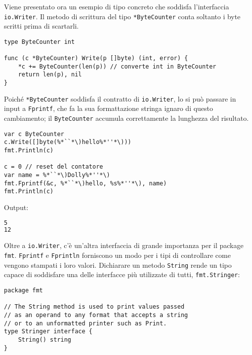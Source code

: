 Viene presentato ora un esempio di tipo concreto che soddisfa l'interfaccia \verb|io.Writer|.
Il metodo di scrittura del tipo \verb|*ByteCounter| conta soltanto i byte scritti prima di scartarli.
\begin{lstlisting}[frame=single, label={lst:lstlisting6-1.3}]
type ByteCounter int

func (c *ByteCounter) Write(p []byte) (int, error) {
    *c += ByteCounter(len(p)) // converte int in ByteCounter
    return len(p), nil
}
\end{lstlisting}
Poiché \verb|*ByteCounter| soddisfa il contratto di \verb|io.Writer|, lo si può passare in input a \verb|Fprintf|, che fa la sua formattazione stringa ignaro di questo cambiamento;
il \verb|ByteCounter| accumula correttamente la lunghezza del risultato.
\begin{lstlisting}[frame=single, label={lst:lstlisting6-1.4}]
var c ByteCounter
c.Write([]byte(%*``*\)hello%*''*\)))
fmt.Println(c)

c = 0 // reset del contatore
var name = %*``*\)Dolly%*''*\)
fmt.Fprintf(&c, %*``*\)hello, %s%*''*\), name)
fmt.Println(c)
\end{lstlisting}
Output:
\begin{lstlisting}[language=bash, frame=L, label={lst:lstlisting6-1.5}]
5
12
\end{lstlisting}
Oltre a \verb|io.Writer|, c'è un'altra interfaccia di grande importanza per il package \verb|fmt|.
\verb|Fprintf| e \verb|Fprintln| forniscono un modo per i tipi di controllare come vengono stampati i loro valori.
Dichiarare un metodo \verb|String| rende un tipo capace di soddisfare una delle interfacce più utilizzate di tutti, \verb|fmt.Stringer|:
\begin{lstlisting}[frame=single, label={lst:lstlisting6-1.6}]
package fmt

// The String method is used to print values passed
// as an operand to any format that accepts a string
// or to an unformatted printer such as Print.
type Stringer interface {
    String() string
}
\end{lstlisting}